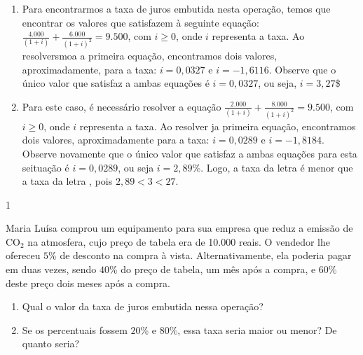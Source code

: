 \begin{resposta}{}
{
  \begin{enumerate}
    \item Para encontrarmos a taxa de juros embutida nesta operação, temos que encontrar os valores que satisfazem à seguinte equação: $\displaystyle\frac{4.000}{(1+i)}+\frac{6.000}{(1+i)^2}=9.500$, com $i\geq0$, onde $i$ representa a taxa. Ao resolversmoa a primeira equação, encontramos dois valores, aproximadamente, para a taxa:  $i=0{,}0327$ e $i=-1{,}6116$. Observe que o único valor que satisfaz a ambas equações é $i=0{,}0327$, ou seja, $i=3{,}27$\$
    \item Para este caso, é necessário resolver a equação $\displaystyle\frac{2.000}{(1+i)}+\frac{8.000}{(1+i)^2}=9.500$, com $i\geq0$, onde $i$ representa a taxa. Ao resolver ja primeira equação, encontramos dois valores, aproximadamente para a taxa: $i=0{,}0289$ e $i=-1{,}8184$. Observe novamente que o único valor que satisfaz a ambas equações para esta seituação é $i=0{,}0289$, ou seja $i=2{,}89$\%. Logo, a taxa da letra  é menor que a taxa da letra , pois $2{,}89<3<27$.
  \end{enumerate}
}{1}
\end{resposta}
\begin{task}{}
Maria Luísa comprou um equipamento para sua empresa que reduz a emissão de CO$_2$ na atmosfera, cujo preço de tabela era de 10.000 reais. O vendedor lhe ofereceu $5$\% de desconto na compra à vista. Alternativamente, ela poderia pagar em duas vezes, sendo $40$\% do preço de tabela, um mês após a compra, e $60$\% deste preço dois meses após a compra.
\begin{enumerate}
  \item Qual o valor da taxa de juros embutida nessa operação?
  \item Se os percentuais fossem $20$\% e $80$\%, essa taxa seria maior ou menor? De quanto seria?
\end{enumerate}
\end{task}

